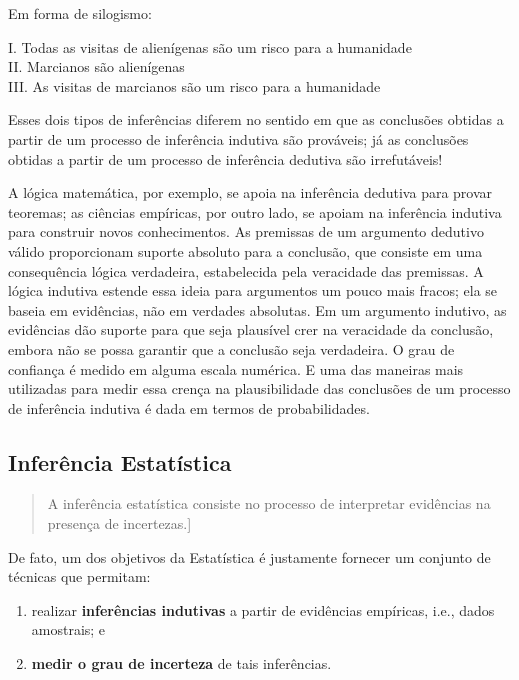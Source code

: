 \documentclass[
]{book}
\theoremstyle{definition}
\theoremstyle{definition}
\theoremstyle{definition}
\theoremstyle{remark}
\begin{document}
Em forma de silogismo:

I. Todas as visitas de alienígenas são um risco para a humanidade\\
II. Marcianos são alienígenas\\
III. As visitas de marcianos são um risco para a humanidade

Esses dois tipos de inferências diferem no sentido em que as conclusões obtidas a partir de um processo de inferência indutiva são prováveis; já as conclusões obtidas a partir de um processo de inferência dedutiva são irrefutáveis!

A lógica matemática, por exemplo, se apoia na inferência dedutiva para provar teoremas; as ciências empíricas, por outro lado, se apoiam na inferência indutiva para construir novos conhecimentos. As premissas de um argumento dedutivo válido proporcionam suporte absoluto para a conclusão, que consiste em uma consequência lógica verdadeira, estabelecida pela veracidade das premissas. A lógica indutiva estende essa ideia para argumentos um pouco mais fracos; ela se baseia em evidências, não em verdades absolutas. Em um argumento indutivo, as evidências dão suporte para que seja plausível crer na veracidade da conclusão, embora não se possa garantir que a conclusão seja verdadeira. O grau de confiança é medido em alguma escala numérica. E uma das maneiras mais utilizadas para medir essa crença na plausibilidade das conclusões de um processo de inferência indutiva é dada em termos de probabilidades.

\hypertarget{inferuxeancia-estatuxedstica}{%
\subsection*{Inferência Estatística}\label{inferuxeancia-estatuxedstica}}

\begin{quote}
A inferência estatística consiste no processo de interpretar evidências na presença de incertezas.{]}
\end{quote}

De fato, um dos objetivos da Estatística é justamente fornecer um conjunto de técnicas que permitam:

\begin{enumerate}
\def\labelenumi{\roman{enumi}.}
\item
  realizar \textbf{inferências indutivas} a partir de evidências empíricas, i.e., dados amostrais; e
\item
  \textbf{medir o grau de incerteza} de tais inferências.
\end{enumerate}
\end{document}
